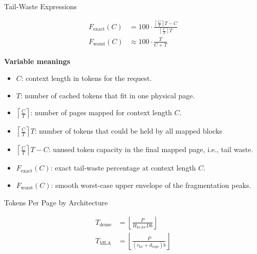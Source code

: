 \documentclass[12pt]{article}
\begin{document}
\begin{center}
{\LARGE Tail-Waste Expressions}
\end{center}

\vspace{0.5em}

\begin{align*}
F_{\text{exact}}(C)
&=
100 \cdot
\frac{\left\lceil \frac{C}{T} \right\rceil T - C}
{\left\lceil \frac{C}{T} \right\rceil T}
\\[1.0em]
F_{\text{worst}}(C)
&\approx
100 \cdot \frac{T}{C + T}
\end{align*}

\vspace{0.8em}

\noindent\textbf{Variable meanings}
\begin{itemize}
    \item $C$: context length in tokens for the request.
    \item $T$: number of cached tokens that fit in one physical page.
    \item $\left\lceil \frac{C}{T} \right\rceil$: number of pages mapped for context length $C$.
    \item $\left\lceil \frac{C}{T} \right\rceil T$: number of tokens that could be held by all mapped blocks
    \item $\left\lceil \frac{C}{T} \right\rceil T - C$: unused token capacity in the final mapped page, i.e., tail waste.
    \item $F_{\text{exact}}(C)$: exact tail-waste percentage at context length $C$.
    \item $F_{\text{worst}}(C)$: smooth worst-case upper envelope of the fragmentation peaks.
\end{itemize}

\newpage

\begin{center}
{\LARGE Tokens Per Page by Architecture}
\end{center}

\vspace{0.5em}

\begin{align*}
T_{\text{dense}}
&=
\left\lfloor
\frac{P}{H_{\text{kv,loc}} D b}
\right\rfloor
\\[1.2em]
T_{\text{MLA}}
&=
\left\lfloor
\frac{P}{(r_{\text{kv}} + d_{\text{rope}}) b}
\right\rfloor
\end{align*}

\vspace{0.8em}
\end{document}
